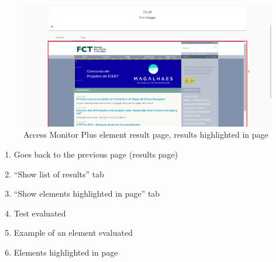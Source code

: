 \begin{figure}[H]
    \centering
    \includegraphics[width=\linewidth]{lib/images/amp/element_result_page_page.png}
    \caption{Access Monitor Plus element result page, results highlighted in page}
    \label{fig:amp_element_result_page_page}
\end{figure}

\begin{enumerate}
    \item Goes back to the previous page (results page)
    \item ``Show list of results'' tab
    \item ``Show elements highlighted in page'' tab
    \item Test evaluated
    \item Example of an element evaluated
    \item Elements highlighted in page
\end{enumerate}
